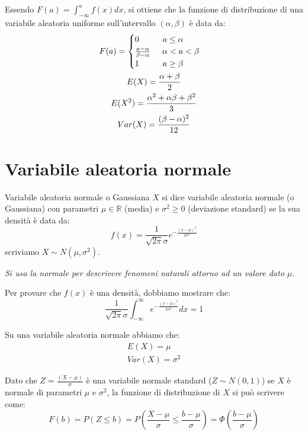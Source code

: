 Essendo $F(a)=\int^a_{-\infty}f(x)dx$, si ottiene che la funzione di distribuzione di una variabile aleatoria uniforme sull'intervallo $(\alpha, \beta)$ è data da:
\begin{gather*}
    F(a)=\begin{cases}
        0\hspace{1cm}a\leq \alpha\\
        \frac{a-\alpha}{\beta-\alpha}\hspace{0.5cm}\alpha<a<\beta\\
        1\hspace{1cm}a\geq\beta
    \end{cases}\\
    E(X)=\frac{\alpha+\beta}{2}\\
    E(X^2)=\frac{\alpha^2+\alpha\beta+\beta^2}{3}\\
    Var(X)=\frac{(\beta-\alpha)^2}{12}
\end{gather*}

\section{Variabile aleatoria normale}
\begin{Definition}{Variabile aleatoria normale o Gaussiana}{}
    $X$ si dice variabile aleatoria normale (o Gaussiana) con parametri $\mu\in\mathbb{R}$ (media) e $\sigma^2\geq0$ (deviazione standard) se la sua densità è data da:
    \begin{equation*}
        f(x)=\frac{1}{\sqrt{2\pi}\sigma}e^{-\frac{(x-\mu)^2}{2\sigma^2}}
    \end{equation*}
    scriviamo $X\sim N(\mu, \sigma^2)$.

    \textit{Si usa la normale per descrivere fenomeni naturali attorno ad un valore dato $\mu$.}
\end{Definition}
Per provare che $f(x)$ è una densità, dobbiamo mostrare che:
\begin{equation*}
    \frac{1}{\sqrt{2\pi}\sigma}\int^\infty_{-\infty}e^{-\frac{(x-\mu)^2}{2\sigma^2}}dx=1
\end{equation*}

Su una variabile aleatoria normale abbiamo che:
\begin{gather*}
    E(X)=\mu\\
    Var(X)=\sigma^2
\end{gather*}

Dato che $Z=\frac{(X-\mu)}{\sigma}$ è una variabile normale standard ($Z\sim N(0,1)$) se $X$ è normale di parametri $\mu$ e $\sigma^2$, la funzione di distribuzione di $X$ si può scrivere come:
\begin{equation*}
    F(b)=P(Z\leq b)=P\left(\frac{X-\mu}{\sigma}\leq\frac{b-\mu}{\sigma}\right)=\Phi\left(\frac{b-\mu}{\sigma}\right)
\end{equation*}

